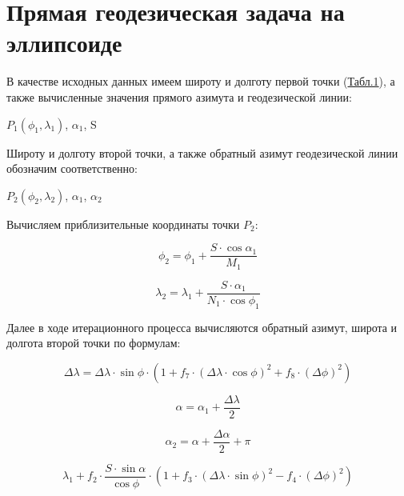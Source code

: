 \documentclass[a4paper,14pt]{article}
\newcommand\indent[1][1cm]{\hspace*{#1}}
\begin{document}
\newpage
\section{Прямая геодезическая задача на эллипсоиде}
В качестве исходных данных  имеем широту и долготу первой точки (\hyperlink{table_1}{Табл.1}), а также вычисленные значения прямого азимута и геодезической линии:

\begin{center}
    $P_1(\phi_1, \lambda_1)$, $\alpha_1$, S\\
\end{center}

\indent Широту и долготу второй точки, а также обратный азимут геодезической линии обозначим соответственно:

\begin{center}
    $P_2(\phi_2, \lambda_2)$, $\alpha_1$, $\alpha_2$\\
\end{center}

\indent Вычисляем приблизительные координаты точки $P_2$:

\begin{equation}
    \phi_2 = \phi_1 + \frac{S \cdot \cos{\alpha_1}}{M_1}
\end{equation}

\begin{equation}
    \lambda_2 = \lambda_1 + \frac{S \cdot \alpha_1}{N_1 \cdot \cos{\phi_1}}
\end{equation}

\indent Далее в ходе итерационного процесса вычисляются обратный азимут, широта и долгота второй точки по формулам:

\begin{equation}
    \Delta\lambda = \Delta\lambda \cdot \sin{\phi} \cdot \left (1 + f_7 \cdot (\Delta\lambda \cdot \cos{\phi})^2 + f_8 \cdot (\Delta\phi)^2 \right)
\end{equation}

\begin{equation}
    \alpha = \alpha_1 + \frac{\Delta\lambda}{2}
\end{equation}

\begin{equation}
    \alpha_2 = \alpha + \frac{\Delta\alpha}{2} + \pi
\end{equation}

\begin{equation}
    \lambda_1 + f_2 \cdot \frac{S \cdot \sin{\alpha}}{\cos{\phi}} \cdot \left(1 + f_3 \cdot (\Delta\lambda \cdot \sin{\phi})^2 - f_4 \cdot (\Delta\phi)^2 \right)
\end{equation}
\end{document}
